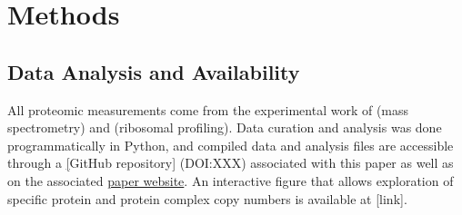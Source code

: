 \section{Methods}

\subsection{Data Analysis and Availability}
All proteomic measurements come from the experimental work of \cite{schmidt2016,
peebo2015, valgepea2013} (mass spectrometry) and \cite{li2014} (ribosomal
profiling). Data curation and analysis was done programmatically in Python, and
compiled data and analysis files are accessible through a
\href{https://github.com/rpgroup-pboc/growth_limits}[GitHub repository]
(DOI:XXX) associated with this paper as well as on the associated
\href{https://rpgroup.caltech.edu/growth_limits}{paper website}. An interactive
figure that allows exploration of specific protein and protein complex copy
numbers is available at [link].
